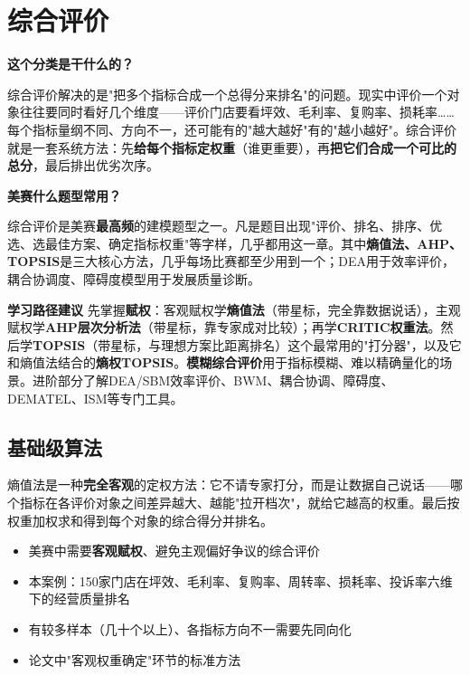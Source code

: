 \chapter{综合评价}

\begin{chapteroverview}
\textbf{这个分类是干什么的？}

综合评价解决的是"把多个指标合成一个总得分来排名"的问题。现实中评价一个对象往往要同时看好几个维度——评价门店要看坪效、毛利率、复购率、损耗率……每个指标量纲不同、方向不一，还可能有的"越大越好"有的"越小越好"。综合评价就是一套系统方法：先\textbf{给每个指标定权重}（谁更重要），再\textbf{把它们合成一个可比的总分}，最后排出优劣次序。

\textbf{美赛什么题型常用？}

综合评价是美赛\textbf{最高频}的建模题型之一。凡是题目出现"评价、排名、排序、优选、选最佳方案、确定指标权重"等字样，几乎都用这一章。其中\textbf{熵值法、AHP、TOPSIS}是三大核心方法，几乎每场比赛都至少用到一个；DEA用于效率评价，耦合协调度、障碍度模型用于发展质量诊断。

\textbf{学习路径建议}
先掌握\textbf{赋权}：客观赋权学\textbf{熵值法}（带星标，完全靠数据说话），主观赋权学\textbf{AHP层次分析法}（带星标，靠专家成对比较）；再学\textbf{CRITIC权重法}。然后学\textbf{TOPSIS}（带星标，与理想方案比距离排名）这个最常用的"打分器"，以及它和熵值法结合的\textbf{熵权TOPSIS}。\textbf{模糊综合评价}用于指标模糊、难以精确量化的场景。进阶部分了解DEA/SBM效率评价、BWM、耦合协调、障碍度、DEMATEL、ISM等专门工具。
\end{chapteroverview}

\section{基础级算法}


\begin{algointro}
熵值法是一种\textbf{完全客观}的定权方法：它不请专家打分，而是让数据自己说话——哪个指标在各评价对象之间差异越大、越能"拉开档次"，就给它越高的权重。最后按权重加权求和得到每个对象的综合得分并排名。
\end{algointro}

\begin{algoscene}
\begin{itemize}
    \item 美赛中需要\textbf{客观赋权}、避免主观偏好争议的综合评价
    \item 本案例：150家门店在坪效、毛利率、复购率、周转率、损耗率、投诉率六维下的经营质量排名
    \item 有较多样本（几十个以上）、各指标方向不一需要先同向化
    \item 论文中"客观权重确定"环节的标准方法
\end{itemize}
\end{algoscene}

